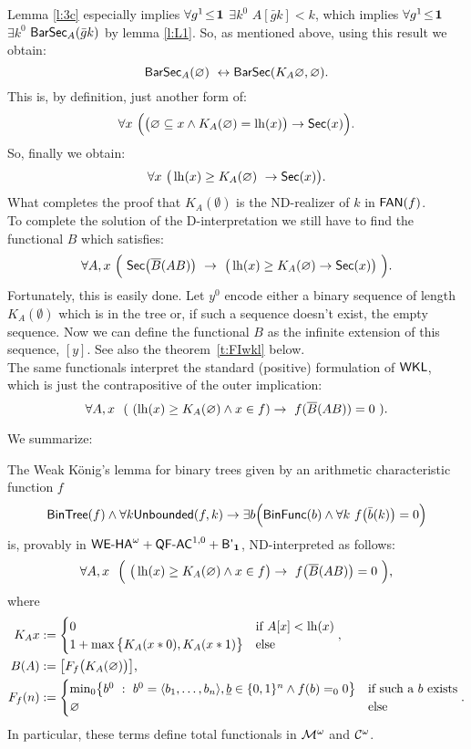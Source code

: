 Lemma \ref{l:3c} especially implies $\forall g^1\!\leq\!\mathbf1$ $\exists k^0$  $A[\bar gk]<k$, which
implies $\forall g^1\!\leq\!\mathbf1$ $\exists k^0$ $\textsf{\upshape BarSec}_A(\bar gk)$ by lemma \ref{l:L1}. 
So, as mentioned above, using this result we obtain:
\[ \textsf{\upshape BarSec}_A(\varnothing)\ \leftrightarrow \textsf{\upshape BarSec}(K_A\varnothing, \varnothing) \text{.}\]
This is, by definition, just another form of:
\[ \forall x\ \Big(\big(\emptyset \subseteq x \wedge K_A(\emptyset)=\lh(x)\big) \rightarrow \Sec(x)\Big) \text{.}\]
So, finally we obtain:
\[  \forall x\ \big(\operatorname{lh}(x)\geq K_A(\varnothing)\  \rightarrow \textsf{\upshape Sec}(x)\big) \text{.}\]
What completes the proof that $K_A(\emptyset)$ is the ND-realizer
of $k$ in $\textsf{\upshape FAN}(f)$.\\

To complete the solution of the D-interpretation we still have to 
find the functional $B$ which satisfies:
\[
\forall A,x\ \Big(\ 
\Sec\big(\overline{B}(AB)\big)\ \rightarrow\ 
    \big(\lh(x)\geq K_A(\emptyset)\rightarrow \Sec(x)\big)
\ \Big)
\text{.}\]
Fortunately, this is easily done. Let $y^0$ encode either a binary sequence 
of length $K_A(\emptyset)$ which is in the tree or, if such a sequence doesn't exist, the empty
sequence. Now we can define the functional $B$ as the infinite extension of this sequence, $[y]$.
See also the theorem~\ref{t:FIwkl} below.\\
The same functionals interpret the standard (positive) formulation of $\textsf{\upshape WKL}$, 
which is just the contrapositive of 
the outer implication:
\[
\forall A,x\ \ (\ (\lh(x)\geq K_A(\emptyset)\wedge x\in f) \rightarrow\ 
 f(\overline{B}(AB))=0\ )
\text{.}\]
{\samepage
We summarize:
\begin{thm}\label{t:FIwkl-nd}
The Weak K\"onig's lemma for binary trees
given by an arithmetic characteristic function $f$ 
\[
  \BTree(f) \wedge \forall k \UnBounded(f,k) 
     \rightarrow \exists b\Big(\BFunc(b)\wedge\forall k\ f\big(\bar{b}(k)\big)=0\Big)
\]
is, provably in ${\textsf{\upshape WE-HA}}^{\omega}+\textsf{\upshape QF}\textsf{\upshape -}\textsf{\upshape AC}^{1,0}+\textsf{\upshape B'}_{\mathbf1}$, ND-interpreted as follows:
\[
\forall A,x\ \ \Big(\ \big(\lh(x)\geq K_A(\emptyset)\wedge x\in f\big) \rightarrow\ 
 f\big(\overline{B}(AB)\big)=0\ \Big)
\text{,}\]
where
\begin{align*}
K_Ax&:= \begin{cases} 0&\text{if}\ A[x]<\operatorname{lh}(x)\\ 1+\max\big\{K_{A}( x *0),K_A( x *1)\big\}&\text{else} \end{cases}  \text{,} \\
B(A)&:=\big[F_f\big(K_A(\varnothing)\big)\big] \text{,} \\
F_f(n)&:= \begin{cases} {\min}{}_0\big\{b^0\ :\ b^0=\langle b_1,\ldots,b_n\rangle,\underline b\in\{0,1\}^n\wedge f(b)=_00\big\} &\text{if such a $b$ exists}\\ \varnothing&\text{else} \end{cases} 
\text{.}
\end{align*}
In particular, these terms define total functionals in $\mathcal{M} ^\omega$ and $\mathcal{C} ^\omega$.
\end{thm}
} %
